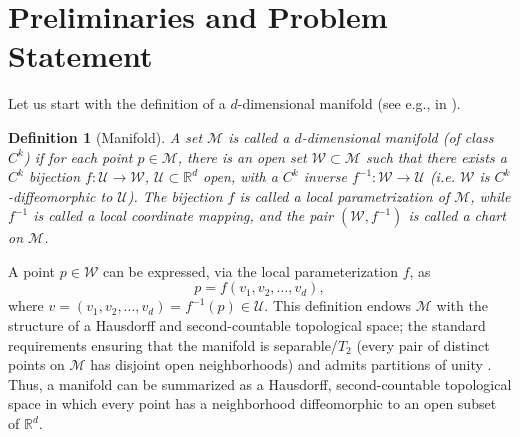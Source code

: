 \documentclass{article}
\newtheorem{definition}{Definition}
\begin{document}
\section{Preliminaries and Problem Statement} \label{sec:Prelim}
Let us start with the definition of a $d$-dimensional manifold (see e.g., in \cite{kuhnel2015differential,wang2012geometric}).
\begin{definition}[Manifold]
\textit{A set $\mathcal{M}$ is called a $d$-dimensional manifold (of class $C^{k}$) if for each point $p \in \mathcal{M}$, there is an open set $\mathcal{W} \subset \mathcal{M}$ such that there exists a $C^{k}$ bijection $f: \mathcal{U} \rightarrow \mathcal{W}$, $\mathcal{U} \subset \mathbb{R}^d$ open, with a $C^{k}$ inverse $f^{-1}: \mathcal{W} \rightarrow \mathcal{U}$ (i.e. $\mathcal{W}$ is $C^{k}$-diffeomorphic to $\mathcal{U}$). The bijection $f$ is called a local parametrization of $\mathcal{M}$, while $f^{-1}$ is called a local coordinate mapping, and the pair $(\mathcal{W},f^{-1})$ is called a chart on $\mathcal{M}$.}
\label{eq:defman}
\end{definition}
A point $p \in \mathcal{W}$ can be expressed, via the local parameterization $f$, as 
\begin{equation}
p=f(v_1,v_2,\dots, v_d), 
\end{equation}
where $v=(v_1,v_2,\dots, v_d)=f^{-1}(p)\in \mathcal{U}$. This definition endows $\mathcal{M}$ with the structure of a Hausdorff and second-countable topological space; the standard requirements ensuring that the manifold is separable/$T_2$ (every pair of distinct points on $\mathcal{M}$ has disjoint open neighborhoods) and admits partitions of unity \cite{kuhnel2015differential,wang2012geometric}. Thus, a manifold can be summarized as a Hausdorff, second-countable topological space in which every point has a neighborhood diffeomorphic to an open subset of $\mathbb{R}^d$.
\end{document}
